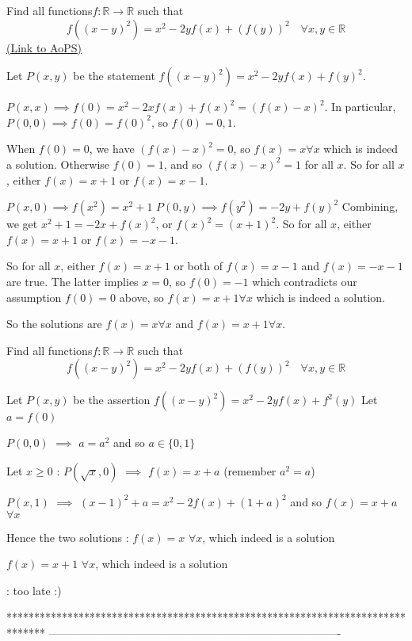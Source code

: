 \begin{problem}
	Find all functions$ f:\mathbb R\to\mathbb R$ such that
\[f((x - y)^2) = x^2 - 2yf(x) + (f(y))^2 \quad \forall x,y\in\mathbb R\]
	\flushright \href{https://artofproblemsolving.com/community/c6h567602}{(Link to AoPS)}
\end{problem}



\begin{solution}
	Let $P(x,y)$ be the statement $f((x-y)^2) = x^2 - 2yf(x) + f(y)^2$.

$P(x,x) \implies f(0) = x^2 - 2xf(x) + f(x)^2 = (f(x) - x)^2$. In particular, $P(0,0) \implies f(0) = f(0)^2$, so $f(0) = 0, 1$.

When $f(0) = 0$, we have $(f(x)-x)^2 = 0$, so $f(x) = x \forall x$ which is indeed a solution. Otherwise $f(0) = 1$, and so $(f(x)-x)^2 = 1$ for all $x$. So for all $x$, either $f(x) = x+1$ or $f(x) = x-1$.

$P(x,0) \implies f(x^2) = x^2 + 1$
$P(0,y) \implies f(y^2) = -2y + f(y)^2$
Combining, we get $x^2 + 1 = -2x + f(x)^2$, or $f(x)^2 = (x + 1)^2$. So for all $x$, either $f(x) = x+1$ or $f(x) = -x-1$.

So for all $x$, either $f(x) = x+1$ or both of $f(x) = x-1$ and $f(x) = -x-1$ are true. The latter implies $x = 0$, so $f(0) = -1$ which contradicts our assumption $f(0) = 0$ above, so $f(x) = x+1 \forall x$ which is indeed a solution.

So the solutions are $f(x) = x \forall x$ and $f(x) = x+1 \forall x$.
\end{solution}



\begin{solution}
	\begin{tcolorbox}Find all functions$ f:\mathbb R\to\mathbb R$ such that
\[f((x - y)^2) = x^2 - 2yf(x) + (f(y))^2 \quad \forall x,y\in\mathbb R\]\end{tcolorbox}
Let $P(x,y)$ be the assertion $f((x-y)^2)=x^2-2yf(x)+f^2(y)$
Let $a=f(0)$

$P(0,0)$ $\implies$ $a=a^2$ and so $a\in\{0,1\}$

Let $x\ge 0$ : $P(\sqrt x,0)$ $\implies$ $f(x)=x+a$ (remember $a^2=a$)

$P(x,1)$ $\implies$ $(x-1)^2+a=x^2-2f(x)+(1+a)^2$ and so $f(x)=x+a$ $\forall x$

Hence the two solutions :
$\boxed{f(x)=x}$ $\forall x$, which indeed is a solution

$\boxed{f(x)=x+1}$ $\forall x$, which indeed is a solution

: too late :)
\end{solution}
*******************************************************************************
-------------------------------------------------------------------------------

